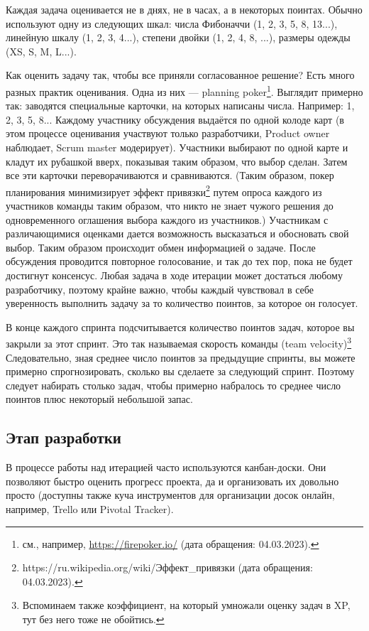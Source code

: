 \documentclass{../../text-style}
\begin{document}
Каждая задача оценивается не в днях, не в часах, а в некоторых поинтах. Обычно используют одну из следующих шкал: числа Фибоначчи (1, 2, 3, 5, 8, 13...), линейную шкалу (1, 2, 3, 4...), степени двойки (1, 2, 4, 8, ...), размеры одежды (XS, S, M, L...).

Как оценить задачу так, чтобы все приняли согласованное решение? Есть много разных практик оценивания. Одна из них --- planning poker\footnote{см., например, \url{https://firepoker.io/} (дата обращения: 04.03.2023).}. Выглядит примерно так: заводятся специальные карточки, на которых написаны числа. Например: 1, 2, 3, 5, 8... Каждому участнику обсуждения выдаётся по одной колоде карт (в этом процессе оценивания участвуют только разработчики, Product owner наблюдает, Scrum master модерирует). Участники выбирают по одной карте и кладут их рубашкой вверх, показывая таким образом, что выбор сделан. Затем все эти карточки переворачиваются и сравниваются. (Таким образом, покер планирования минимизирует эффект привязки\footnote{https://ru.wikipedia.org/wiki/Эффект\_привязки (дата обращения: 04.03.2023).} путем опроса каждого из участников команды таким образом, что никто не знает чужого решения до одновременного оглашения выбора каждого из участников.) Участникам с различающимися оценками дается возможность высказаться и обосновать свой выбор. Таким образом происходит обмен информацией о задаче. После обсуждения проводится повторное голосование, и так до тех пор, пока не будет достигнут консенсус. Любая задача в ходе итерации может достаться любому разработчику, поэтому крайне важно, чтобы каждый чувствовал в себе уверенность выполнить задачу за то количество поинтов, за которое он голосует.

В конце каждого спринта подсчитывается количество поинтов задач, которое вы закрыли за этот спринт. Это так называемая скорость команды (team velocity)\footnote{Вспоминаем также коэффициент, на который умножали оценку задач в XP, тут без него тоже не обойтись.} Следовательно, зная среднее число поинтов за предыдущие спринты, вы можете примерно спрогнозировать, сколько вы сделаете за следующий спринт. Поэтому следует набирать столько задач, чтобы примерно набралось то среднее число поинтов плюс некоторый небольшой запас.

\subsection{Этап разработки}

В процессе работы над итерацией часто используются канбан-доски. Они  позволяют быстро оценить прогресс проекта, да и организовать их довольно просто (доступны также куча инструментов для организации досок онлайн, например, Trello или Pivotal Tracker).
\end{document}
